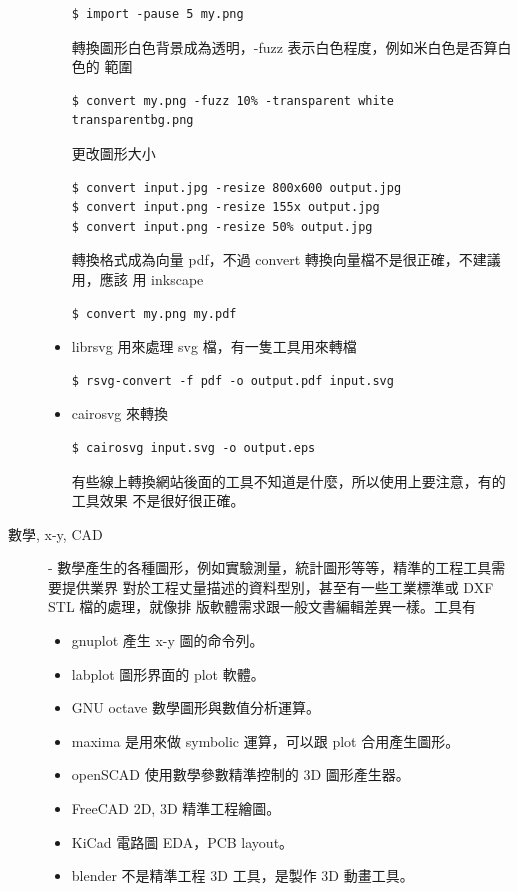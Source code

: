 \begin{description}
\begin{itemize}
\begin{verbatim}
$ import -pause 5 my.png
        \end{verbatim}
        轉換圖形白色背景成為透明，-fuzz 表示白色程度，例如米白色是否算白色的
        範圍
        \begin{verbatim}
$ convert my.png -fuzz 10% -transparent white transparentbg.png
        \end{verbatim}
        更改圖形大小
        \begin{verbatim}
$ convert input.jpg -resize 800x600 output.jpg
$ convert input.png -resize 155x output.jpg
$ convert input.png -resize 50% output.jpg
        \end{verbatim}
        轉換格式成為向量 pdf，不過 convert 轉換向量檔不是很正確，不建議用，應該
        用 inkscape
        \begin{verbatim}
$ convert my.png my.pdf
        \end{verbatim}
      \item librsvg 用來處理 svg 檔，有一隻工具用來轉檔
        \begin{verbatim}
$ rsvg-convert -f pdf -o output.pdf input.svg
        \end{verbatim}
      \item cairosvg 來轉換
        \begin{verbatim}
$ cairosvg input.svg -o output.eps
        \end{verbatim}
        有些線上轉換網站後面的工具不知道是什麼，所以使用上要注意，有的工具效果
        不是很好很正確。
    \end{itemize}
  \item [數學, x-y, CAD] -
    數學產生的各種圖形，例如實驗測量，統計圖形等等，精準的工程工具需要提供業界
    對於工程丈量描述的資料型別，甚至有一些工業標準或 DXF STL 檔的處理，就像排
    版軟體需求跟一般文書編輯差異一樣。工具有
    \begin{itemize}
      \item gnuplot 產生 x-y 圖的命令列。
      \item labplot 圖形界面的 plot 軟體。
      \item GNU octave 數學圖形與數值分析運算。
      \item maxima 是用來做 symbolic 運算，可以跟 plot 合用產生圖形。
      \item openSCAD 使用數學參數精準控制的 3D 圖形產生器。
      \item FreeCAD 2D, 3D 精準工程繪圖。
      \item KiCad 電路圖 EDA，PCB layout。
      \item blender 不是精準工程 3D 工具，是製作 3D 動畫工具。

\end{itemize}
\end{description}
